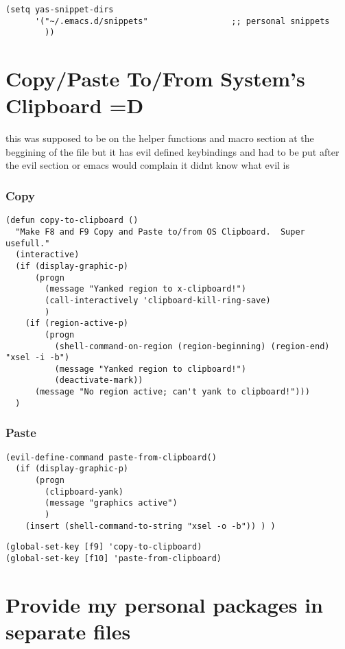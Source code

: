 \documentclass[11pt]{article}
\begin{document}
\begin{verbatim}
(setq yas-snippet-dirs
      '("~/.emacs.d/snippets"                 ;; personal snippets
        ))
\end{verbatim}


\section*{Copy/Paste To/From System's Clipboard =D}
\label{sec:orgccfceb7}
this was supposed to be on the helper functions and macro section at the beggining of the file
but it has evil defined keybindings and had to be put after the evil section or emacs would complain it didnt know what evil is

\subsubsection*{Copy}
\label{sec:org7428cf8}

\begin{verbatim}
(defun copy-to-clipboard ()
  "Make F8 and F9 Copy and Paste to/from OS Clipboard.  Super usefull."
  (interactive)
  (if (display-graphic-p)
      (progn
        (message "Yanked region to x-clipboard!")
        (call-interactively 'clipboard-kill-ring-save)
        )
    (if (region-active-p)
        (progn
          (shell-command-on-region (region-beginning) (region-end) "xsel -i -b")
          (message "Yanked region to clipboard!")
          (deactivate-mark))
      (message "No region active; can't yank to clipboard!")))
  )
\end{verbatim}


\subsubsection*{Paste}
\label{sec:org567ad4e}

\begin{verbatim}
(evil-define-command paste-from-clipboard()
  (if (display-graphic-p)
      (progn
        (clipboard-yank)
        (message "graphics active")
        )
    (insert (shell-command-to-string "xsel -o -b")) ) )
\end{verbatim}

\begin{verbatim}
(global-set-key [f9] 'copy-to-clipboard)
(global-set-key [f10] 'paste-from-clipboard)
\end{verbatim}


\section*{Provide my personal packages in separate files}
\label{sec:orgac9fc2a}
\end{document}
